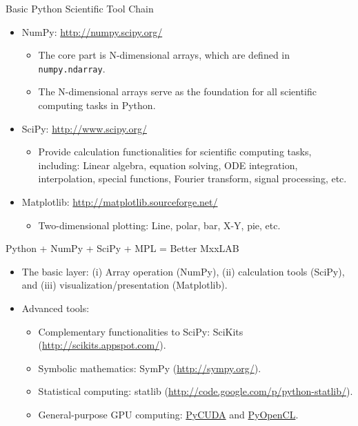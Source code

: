 \documentclass[dvips,xcolor=pst]{beamer}
\begin{document}
\begin{frame}{
%
Basic Python Scientific Tool Chain
%
}
\begin{itemize} \large
  \item NumPy: \url{http://numpy.scipy.org/}
  \begin{itemize} \large
    \item The core part is N-dimensional arrays, which are defined in
    \texttt{numpy.ndarray}.
    \item The N-dimensional arrays serve as the foundation for all
    scientific computing tasks in Python.
  \end{itemize}
  \item SciPy: \url{http://www.scipy.org/}
  \begin{itemize} \large
    \item Provide calculation functionalities for scientific computing tasks,
    including: Linear algebra, equation solving, ODE integration,
    interpolation, special functions, Fourier transform, signal processing,
    etc.
  \end{itemize}
  \item Matplotlib: \url{http://matplotlib.sourceforge.net/}
  \begin{itemize} \large
    \item Two-dimensional plotting: Line, polar, bar, X-Y, pie, etc.
  \end{itemize}
\end{itemize}
\end{frame}

\begin{frame}{
%
Python + NumPy + SciPy + MPL = Better MxxLAB
%
}
\begin{itemize} \large
  \item The basic layer: (i) Array operation (NumPy), (ii) calculation tools
  (SciPy), and (iii) visualization/presentation (Matplotlib).
  \item Advanced tools:
  \begin{itemize} \large
    \item Complementary functionalities to SciPy: SciKits
    (\url{http://scikits.appspot.com/}).
    \item Symbolic mathematics: SymPy (\url{http://sympy.org/}).
    \item Statistical computing: statlib
    (\url{http://code.google.com/p/python-statlib/}).
    \item General-purpose GPU computing:
    \href{http://mathema.tician.de/software/pycuda}{PyCUDA} and
    \href{http://mathema.tician.de/software/pyopencl}{PyOpenCL}.
  \end{itemize}
\end{itemize}
\end{frame}
\end{document}
